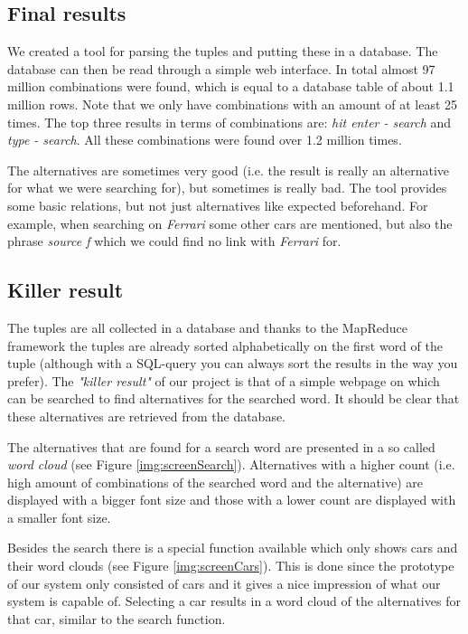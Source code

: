 \documentclass{sig-alternate}
\begin{document}
\subsection{Final results}
We created a tool for parsing the tuples and putting these in a database. The database can then be read through a simple web interface. In total almost 97 million combinations were found, which is equal to a database table of about 1.1 million rows. Note that we only have combinations with an amount of at least 25 times. The top three results in terms of combinations are: \emph{hit enter - search} and \emph{type - search}. All these combinations were found over 1.2 million times.

The alternatives are sometimes very good (i.e. the result is really an alternative for what we were searching for), but sometimes is really bad. The tool provides some basic relations, but not just alternatives like expected beforehand. For example, when searching on \emph{Ferrari} some other cars are mentioned, but also the phrase \emph{source f} which we could find no link with \emph{Ferrari} for.

\subsection{Killer result}
The tuples are all collected in a database and thanks to the MapReduce framework the tuples are already sorted alphabetically on the first word of the tuple (although with a SQL-query you can always sort the results in the way you prefer). The \emph{"killer result"} of our project is that of a simple webpage on which can be searched to find alternatives for the searched word. It should be clear that these alternatives are retrieved from the database.

The alternatives that are found for a search word are presented in a so called \emph{word cloud} (see Figure \ref{img:screenSearch}). Alternatives with a higher count (i.e. high amount of combinations of the searched word and the alternative) are displayed with a bigger font size and those with a lower count are displayed with a smaller font size.

Besides the search there is a special function available which only shows cars and their word clouds (see Figure \ref{img:screenCars}). This is done since the prototype of our system only consisted of cars and it gives a nice impression of what our system is capable of. Selecting a car results in a word cloud of the alternatives for that car, similar to the search function.
\end{document}
